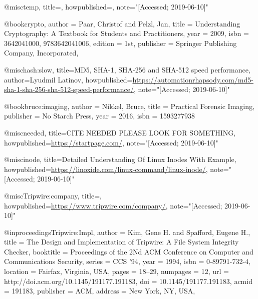 
@misc{temp,
  title={{}},
  howpublished={\url{}},
  note="[Accessed; 2019-06-10]"
}

@book{crypto,
 author = {Paar, Christof and Pelzl, Jan},
 title = {Understanding Cryptography: A Textbook for Students and Practitioners},
 year = {2009},
 isbn = {3642041000, 9783642041006},
 edition = {1st},
 publisher = {Springer Publishing Company, Incorporated},
}

@misc{hash:slow,
  title={{MD5, SHA-1, SHA-256 and SHA-512 speed performance}},
  author={Lyudmil Latinov},
  howpublished={\url{https://automationrhapsody.com/md5-sha-1-sha-256-sha-512-speed-performance/}},
  note="[Accessed; 2019-06-10]"
}

@book{bruce:imaging,
  author    = {Nikkel, Bruce}, 
  title     = {Practical Forensic Imaging},
  publisher = {No Starch Press},
  year      = 2016,
  isbn      = {1593277938}
}

@misc{needed,
  title={{CITE NEEDED PLEASE LOOK FOR SOMETHING}},
  howpublished={\url{https://startpage.com/}},
  note="[Accessed; 2019-06-10]"
}

@misc{inode,
  title={{Detailed Understanding Of Linux Inodes With Example}},
  howpublished={\url{https://linoxide.com/linux-command/linux-inode/}},
  note="[Accessed; 2019-06-10]"
}

@misc{Tripwire:company,
  title={{}},
  howpublished={\url{https://www.tripwire.com/company/}},
  note="[Accessed; 2019-06-10]"
}

@inproceedings{Tripwire:Impl,
 author = {Kim, Gene H. and Spafford, Eugene H.},
 title = {The Design and Implementation of Tripwire: A File System Integrity Checker},
 booktitle = {Proceedings of the 2Nd ACM Conference on Computer and Communications Security},
 series = {CCS '94},
 year = {1994},
 isbn = {0-89791-732-4},
 location = {Fairfax, Virginia, USA},
 pages = {18--29},
 numpages = {12},
 url = {http://doi.acm.org/10.1145/191177.191183},
 doi = {10.1145/191177.191183},
 acmid = {191183},
 publisher = {ACM},
 address = {New York, NY, USA},
} 
